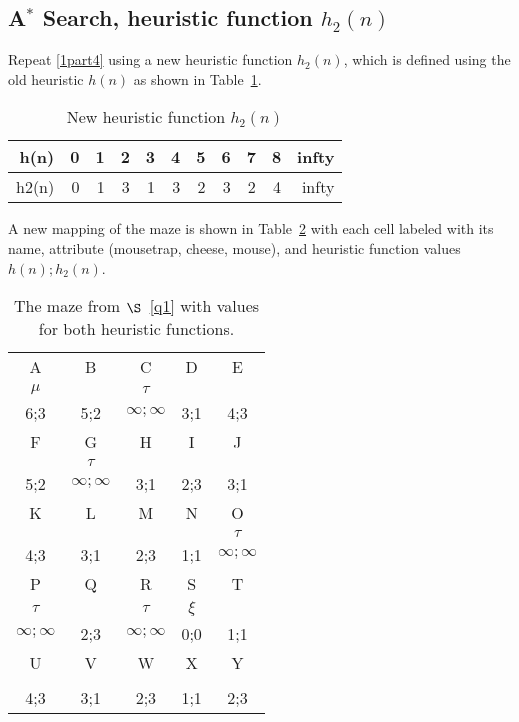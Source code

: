 \documentclass[12pt,letterpaper,titlepage]{article}
\begin{document}
\subsection[Part 5]{A$^*$ Search, heuristic function $h_2\left(n\right)$}
\label{1part5}
Repeat \ref{1part4} using a new heuristic function $h_2(n)$, which is defined using the old heuristic $h(n)$ as shown in Table~\ref{tab:h_2(n)}.
\begin{table}[htbp]
  \centering
  \caption[$h_2(n)$]{New heuristic function $h_2(n)$}
    \begin{tabular}{rrrrrrrrrrr}
    \toprule
    h(n)  & 0     & 1     & 2     & 3     & 4     & 5     & 6     & 7     & 8     & infty \\
    \midrule
    h2(n) & 0     & 1     & 3     & 1     & 3     & 2     & 3     & 2     & 4     & infty \\
    \bottomrule
    \end{tabular}%
  \label{tab:h_2(n)}%
\end{table}%
A new mapping of the maze is shown in Table~\ref{tab:1part5maze} with each cell labeled with its name, attribute (mousetrap, cheese, mouse), and heuristic function values $h(n);h_2(n)$.
\begin{table}[htbp]
  \centering
  \caption[Maze with heuristic values]{The maze from $\S$~\ref{q1} with values for both heuristic functions.}
    \begin{tabular}{ccccc}
    \toprule
    A     & B     & C     & D     & E \\
    $\mu$    &       & $\tau$   &       &  \\
    6;3   & 5;2   & $\infty;\infty$ & 3;1   & 4;3 \\\midrule
    F     & G     & H     & I     & J \\
          & $\tau$   &       &       &  \\
    5;2   & $\infty;\infty$ & 3;1   & 2;3   & 3;1 \\\midrule
    K     & L     & M     & N     & O \\
          &       &       &       & $\tau$ \\
    4;3   & 3;1   & 2;3   & 1;1   & $\infty;\infty$ \\\midrule
    P     & Q     & R     & S     & T \\
    $\tau$   &    & $\tau$   & $\xi$    &  \\
    $\infty;\infty$ & 2;3   & $\infty;\infty$ &  0;0  & 1;1 \\\midrule
    U     & V     & W     & X     & Y \\
          &       &       &       &  \\
    4;3   & 3;1   & 2;3   & 1;1   & 2;3 \\
    \bottomrule
    \end{tabular}%
  \label{tab:1part5maze}%
\end{table}%
\end{document}
